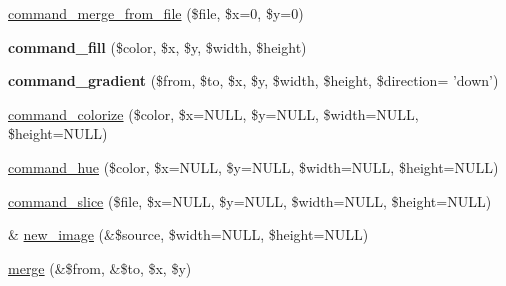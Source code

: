 \begin{DoxyCompactItemize}
\item 
\hyperlink{classctools__stylizer__image__processor_ab20bbac2bcb27f38f8a20334df367814}{command\_\-merge\_\-from\_\-file} (\$file, \$x=0, \$y=0)
\item 
\hypertarget{classctools__stylizer__image__processor_ac515b22855b71d70b8d2a7cc91adddb2}{
{\bfseries command\_\-fill} (\$color, \$x, \$y, \$width, \$height)}
\label{classctools__stylizer__image__processor_ac515b22855b71d70b8d2a7cc91adddb2}

\item 
\hypertarget{classctools__stylizer__image__processor_ad112b95890e574fd3b43906361d515a3}{
{\bfseries command\_\-gradient} (\$from, \$to, \$x, \$y, \$width, \$height, \$direction= 'down')}
\label{classctools__stylizer__image__processor_ad112b95890e574fd3b43906361d515a3}

\item 
\hyperlink{classctools__stylizer__image__processor_a1bb5df184af0c953ce5d12567ec4282f}{command\_\-colorize} (\$color, \$x=NULL, \$y=NULL, \$width=NULL, \$height=NULL)
\item 
\hyperlink{classctools__stylizer__image__processor_afd565f19f356b713eb24cd0248353ea2}{command\_\-hue} (\$color, \$x=NULL, \$y=NULL, \$width=NULL, \$height=NULL)
\item 
\hyperlink{classctools__stylizer__image__processor_a55f0e3264a997323ff12a50a26895238}{command\_\-slice} (\$file, \$x=NULL, \$y=NULL, \$width=NULL, \$height=NULL)
\item 
\& \hyperlink{classctools__stylizer__image__processor_a8242ea0531974515e857839f22cbc260}{new\_\-image} (\&\$source, \$width=NULL, \$height=NULL)
\item 
\hyperlink{classctools__stylizer__image__processor_ad1e623018b023fc6cc484759778b4bbd}{merge} (\&\$from, \&\$to, \$x, \$y)
\end{DoxyCompactItemize}
